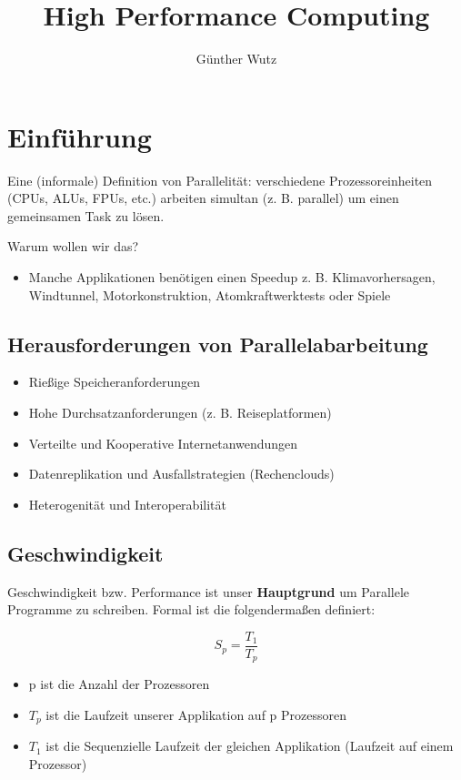 \documentclass[twocolumn, a4paper, 10pt, DIV12]{scrreprt}
\title{High Performance Computing}
\author{Günther Wutz}
\begin{document}
\maketitle
\chapter*{Einführung}
Eine (informale) Definition von Parallelität: verschiedene Prozessoreinheiten 
(CPUs, ALUs, FPUs, etc.) arbeiten simultan (z. B. parallel) um einen gemeinsamen
Task zu lösen.

Warum wollen wir das?
\begin{itemize}
\item Manche Applikationen benötigen einen Speedup z. B. Klimavorhersagen,
        Windtunnel, Motorkonstruktion, Atomkraftwerktests oder Spiele
\end{itemize}

\section*{Herausforderungen von Parallelabarbeitung}
\begin{itemize}
\item Rießige Speicheranforderungen
\item Hohe Durchsatzanforderungen (z. B. Reiseplatformen)
\item Verteilte und Kooperative Internetanwendungen
\item Datenreplikation und Ausfallstrategien (Rechenclouds)
\item Heterogenität und Interoperabilität
\end{itemize}

\section*{Geschwindigkeit}
Geschwindigkeit bzw. Performance ist unser \textbf{Hauptgrund} um Parallele
Programme zu schreiben. Formal ist die  folgendermaßen definiert:

\[
S_p = \frac{T_1}{T_p}
\]

\begin{itemize}
    \item p ist die Anzahl der Prozessoren
    \item \(T_p\) ist die Laufzeit unserer Applikation auf p Prozessoren
    \item \(T_1\) ist die Sequenzielle Laufzeit der gleichen Applikation (Laufzeit auf einem Prozessor)
\end{itemize}
\end{document}
